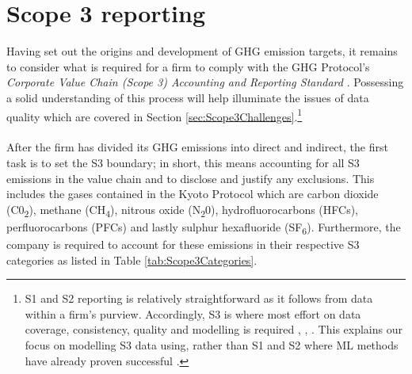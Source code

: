 \documentclass[12pt,twoside]{report}
\begin{document}
\section{Scope 3 reporting} \label{sec:Scope3Reporting}
Having set out the origins and development of GHG emission targets, it remains to consider what is required for a firm to comply with the GHG Protocol's  \textit{Corporate Value Chain (Scope 3) Accounting and Reporting Standard} \cite{ghgscope32013}. Possessing a solid understanding of this process will help illuminate the issues of data quality which are covered in Section \ref{sec:Scope3Challenges}.\footnote{S1 and S2 reporting is relatively straightforward as it follows from data within a firm's purview. Accordingly, S3 is where most effort on data coverage, consistency, quality and modelling is required \cite{ManGroup2022}, \cite{Papadopoulos2022}, \cite{ftserussell2024}. This explains our focus on modelling S3 data using, rather than S1 and S2 where ML methods have already proven successful \cite{nguyen2021}.}
\\ \\
After the firm has divided its GHG emissions into direct and indirect, the first task is to set the S3 boundary; in short, this means accounting for all S3 emissions in the value chain and to disclose and justify any exclusions. This includes the gases contained in the Kyoto Protocol which are carbon dioxide (C0\textsubscript{2}), methane (CH\textsubscript{4}), nitrous oxide (N\textsubscript{2}0), hydrofluorocarbons (HFCs), perfluorocarbons (PFCs) and lastly sulphur hexafluoride (SF\textsubscript{6}). Furthermore, the company is required to account for these emissions in their respective S3 categories as listed in Table \ref{tab:Scope3Categories}. 
\end{document}
